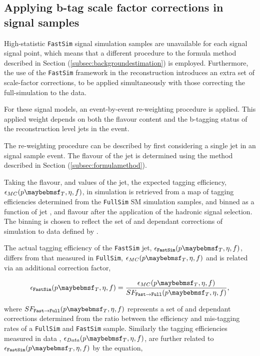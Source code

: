 \subsection{Applying b-tag scale factor corrections in signal samples}
\label{subsec:smsbtagreweighting}

High-statistic \texttt{FastSim} signal simulation samples are unavailable for each signal signal point, which means that a different procedure to the formula method described in Section (\ref{subsec:backgroundestimation}) is employed. Furthermore, the use of the \texttt{FastSim} framework in the reconstruction introduces an extra set of scale-factor corrections, to be applied simultaneously with those correcting the full-simulation to the data. 

For these signal models, an event-by-event re-weighting procedure is applied. This applied weight depends on both the flavour content and the b-tagging status of the reconstruction level jets in the event. 

The re-weighting procedure can be described by first considering a single jet in an signal sample event. The flavour of the jet is determined using the method described in Section (\ref{subsec:formulamethod}). 

Taking the flavour, \pt and \eta values of the jet, the expected tagging efficiency, $\epsilon_{MC}(\pt,\eta,f)$, in simulation is retrieved from a map of tagging efficiencies determined from the \texttt{FullSim} \ac{SM} simulation samples, and binned as a function of jet \pt, \eta and flavour after the application of the hadronic signal selection. The binning is chosen to reflect the set of \pt and \eta dependant corrections of simulation to data defined by \cite{btagscalefactor}.

The actual tagging efficiency of the \texttt{FastSim} jet, $\epsilon_{\texttt{FastSim}}(\pt,\eta,f)$, differs from that measured in \texttt{FullSim},  $\epsilon_{MC}(\pt,\eta,f)$ and is related via an additional correction factor,

\begin{equation}
\epsilon_{\texttt{FastSim}}(\pt,\eta,f) =  \frac{\epsilon_{MC}(\pt,\eta,f)}{SF_{\texttt{Fast}\rightarrow\texttt{Full}}(\pt,\eta,f)} ,
\end{equation}

where $SF_{\texttt{Fast}\rightarrow\texttt{Full}}(\pt,\eta,f)$ represents a set of \pt and \eta dependant corrections determined from the ratio between the efficiency and mis-tagging rates of a \ttbar \texttt{FullSim} and \ttbar \texttt{FastSim} sample. Similarly the tagging efficiencies measured in data \cite{btag8tev}, $\epsilon_{Data}(\pt,\eta,f)$, are further related to $\epsilon_{\texttt{FastSim}}(\pt,\eta,f)$ by the equation,

